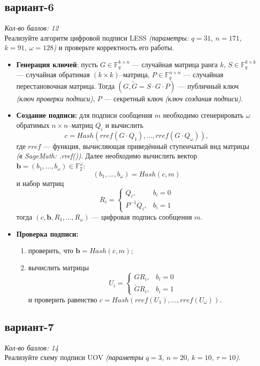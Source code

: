 \documentclass[12pt,letterpaper]{article}
\newcommand{\FF}{\mathds{F}}
\newcommand{\rref}{rref}
\begin{document}
\subsection*{вариант-6}
\textit{Кол-во баллов: 12}\\
Реализуйте алгоритм цифровой подписи LESS \emph{(параметры: $q = 31$, $n = 171$, $k = 91$, $\omega=128$)} и проверьте корректность его работы.
\begin{itemize}
  \item \textbf{Генерация ключей}: пусть $G \in \FF_q^{k \times n}$ --- случайная матрица ранга $k$, $S \in \FF_q^{k \times k}$ --- случайная обратимая $(k \times k)$--матрица, $P \in \FF_q^{n \times n}$ --- случайная перестановочная матрица. Тогда $(G, \tilde{G} = S \cdot G \cdot P)$ --- публичный ключ \emph{(ключ проверки подписи)}, $P$ --- секретный ключ \emph{(ключ создания подписи)}.   
  \item \textbf{Создание подписи:} для подписи сообщения $m$ необходимо сгенерировать $\omega$ обратимых $n\times n$--матриц $Q_i$ и вычислить
  \[
    c = Hash\left( \rref(G \cdot Q_1), \dots, \rref(G \cdot Q_{\omega}) \right),
  \]
  где $\rref$ --- функция, вычисляющая приведённый ступенчатый вид матрицы \emph{(в SageMath: .rref())}. Далее необходимо вычислить вектор $\mathbf{b} = (b_1, \dots, b_{\omega}) \in \FF_2^{\omega}$:
  \[ (b_1, \dots, b_{\omega}) = Hash(c, m)  \]
  и набор матриц 
  \[
    R_i = \begin{cases}
      Q_i, & b_i = 0 \\
      P^{-1} Q_i, & b_i = 1
    \end{cases}
  \]
  тогда $\left( c, \mathbf{b}, R_1, \dots, R_{\omega} \right)$ --- цифровая подпись сообщения $m$.
  \item \textbf{Проверка подписи:}
  \begin{enumerate}
    \item проверить, что $\mathbf{b} = Hash(c, m)$;
    \item вычислить матрицы
    \[ U_i = \begin{cases}
      G R_i, & b_i = 0 \\
      \tilde{G} R_i, & b_i = 1
    \end{cases} \]
    и проверить равенство $c = Hash(rref(U_1), \dots, rref(U_{\omega}))$.
  \end{enumerate}
\end{itemize}

\subsection*{вариант-7}
\textit{Кол-во баллов: 14}\\
Реализуйте схему подписи UOV \emph{(параметры $q = 3$, $n = 20$, $k = 10$, $\tau=10$)}.
\end{document}
